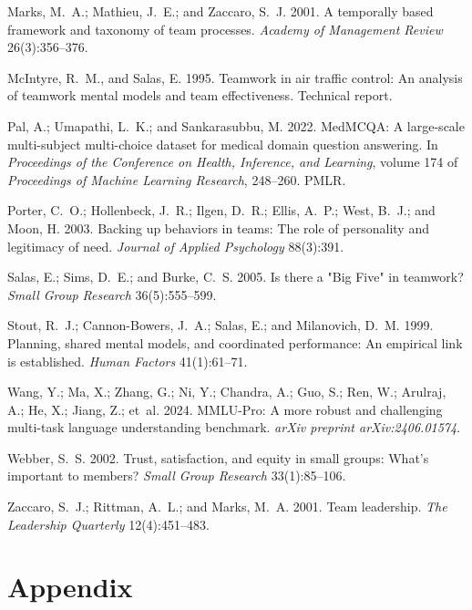 \documentclass[letterpaper]{article} %
\begin{document}
\begin{thebibliography}{99}
Marks, M.~A.; Mathieu, J.~E.; and Zaccaro, S.~J. 2001.
A temporally based framework and taxonomy of team processes.
\textit{Academy of Management Review} 26(3):356--376.

McIntyre, R.~M., and Salas, E. 1995.
Teamwork in air traffic control: An analysis of teamwork mental models and team effectiveness.
Technical report.

Pal, A.; Umapathi, L.~K.; and Sankarasubbu, M. 2022.
MedMCQA: A large-scale multi-subject multi-choice dataset for medical domain question answering.
In \textit{Proceedings of the Conference on Health, Inference, and Learning}, volume 174 of \textit{Proceedings of Machine Learning Research}, 248--260. PMLR.

Porter, C.~O.; Hollenbeck, J.~R.; Ilgen, D.~R.; Ellis, A.~P.; West, B.~J.; and Moon, H. 2003.
Backing up behaviors in teams: The role of personality and legitimacy of need.
\textit{Journal of Applied Psychology} 88(3):391.

Salas, E.; Sims, D.~E.; and Burke, C.~S. 2005.
Is there a "Big Five" in teamwork?
\textit{Small Group Research} 36(5):555--599.

Stout, R.~J.; Cannon-Bowers, J.~A.; Salas, E.; and Milanovich, D.~M. 1999.
Planning, shared mental models, and coordinated performance: An empirical link is established.
\textit{Human Factors} 41(1):61--71.

Wang, Y.; Ma, X.; Zhang, G.; Ni, Y.; Chandra, A.; Guo, S.; Ren, W.; Arulraj, A.; He, X.; Jiang, Z.; et~al. 2024.
MMLU-Pro: A more robust and challenging multi-task language understanding benchmark.
\textit{arXiv preprint arXiv:2406.01574}.

Webber, S.~S. 2002.
Trust, satisfaction, and equity in small groups: What's important to members?
\textit{Small Group Research} 33(1):85--106.

Zaccaro, S.~J.; Rittman, A.~L.; and Marks, M.~A. 2001.
Team leadership.
\textit{The Leadership Quarterly} 12(4):451--483.

\end{thebibliography}


\section{Appendix}
\end{document}
